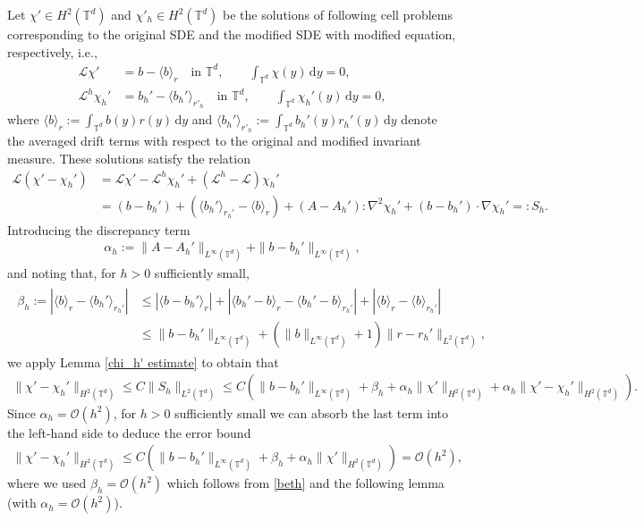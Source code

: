 \documentclass[12pt,a4paper,reqno]{amsart}
\newcommand{\T}{\mathbb{T}}
\numberwithin{equation}{section}
\begin{document}
Let $\chi' \in H^2(\mathbb{T}^d)$ and $\chi'_{h} \in H^2(\mathbb{T}^d)$ be the solutions of following cell problems corresponding to the original SDE and the modified SDE with modified equation, respectively, i.e.,
\begin{align*}
    \mathcal{L} \chi' &= b - \langle b\rangle_r\quad\text{in }\T^d,\qquad \int_{\mathbb{T}^d} \chi(y)\, \mathrm{d}y = 0,\\
    \mathcal{L}^{h}\chi_h' &= b_h' - \langle b_h' \rangle_{r'_h}\quad\text{in }\T^d,\qquad \int_{\mathbb{T}^d} \chi_h'(y)\,\mathrm{d}y = 0,
\end{align*}
where $\langle b\rangle_r := \int_{\T^d} b(y)r(y)\,\mathrm{d}y$ and $\langle b_h'\rangle_{r'_h} := \int_{\mathbb{T}^d} b_h'(y)r_h'(y)\, \mathrm{d}y$ denote the averaged drift terms with respect to the original and modified invariant measure. These solutions satisfy the relation 
\begin{align*}
    \mathcal{L} (\chi' - \chi_h') &= \mathcal{L}\chi' - \mathcal{L}^h \chi_h' + (\mathcal{L}^h-\mathcal{L})\chi_h' \\
    &= (b - b_h') + (\langle b_h' \rangle_{r_h'} -\langle b \rangle_{r}) + (A-A_h'):\nabla^2\chi_h' + (b-b_h')\cdot\nabla \chi_h'  =: S_{h}.
\end{align*}
Introducing the discrepancy term
\begin{align}\label{discr term}
    \alpha_h := \|A-A_h'\|_{L^{\infty}(\T^d)} + \|b-b_h'\|_{L^{\infty}(\T^d)},
\end{align}
and noting that, for $h>0$ sufficiently small,
\begin{align}\label{beth}
\begin{split}
    \beta_h:=\left\lvert\langle b \rangle_{r} -  \langle b_h' \rangle_{r_h'}  \right\rvert &\leq \left\lvert \langle b-b_h' \rangle_{r} \right\rvert + \left\lvert \langle b_h'-b \rangle_{r}-\langle b_h'-b \rangle_{r_h'} \right\rvert + \left\lvert \langle b \rangle_{r}-\langle b \rangle_{r_h'} \right\rvert  \\&\leq \|b-b_h'\|_{L^{\infty}(\T^d)} + \left(\|b\|_{L^{\infty}(\T^d)}+1\right)\|r-r_h'\|_{L^2(\T^d)},
    \end{split}
\end{align}
we apply Lemma \ref{chi_h' estimate} to obtain that
\begin{align*}
    \|\chi' - \chi_{h}'\|_{H^2(\mathbb{T}^d)} \le C\|S_h\|_{L^2(\mathbb{T}^d)} \leq C\left(\|b-b_h'\|_{L^{\infty}(\T^d)} + \beta_h + \alpha_h\|\chi'\|_{H^2(\T^d)} + \alpha_h \|\chi' - \chi_{h}'\|_{H^2(\mathbb{T}^d)} \right).
\end{align*} 
Since $\alpha_h = \mathcal{O}(h^2)$, for $h>0$ sufficiently small we can absorb the last term into the left-hand side to deduce the error bound
\begin{align}\label{H2 bound on chi}
    \|\chi' - \chi_{h}'\|_{H^2(\mathbb{T}^d)} \le C\left(\|b-b_h'\|_{L^{\infty}(\T^d)} + \beta_h + \alpha_h\|\chi'\|_{H^2(\T^d)} \right) = \mathcal{O}(h^2),
\end{align}
where we used $\beta_h = \mathcal{O}(h^2)$ which follows from \eqref{beth} and the following lemma (with $\alpha_h = \mathcal{O}(h^2)$).
  
\end{document}
